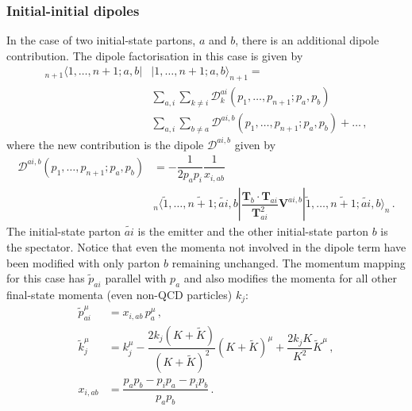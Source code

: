 \documentclass[main.tex]{subfiles}
\begin{document}
        \subsubsection{Initial-initial dipoles}
        In the case of two initial-state partons, $a$ and $b$, there
        is an additional dipole contribution. The dipole factorisation
        in this case is  given by
        \begin{equation}\label{eqn:II_factorisation}
            \begin{split}
                {}_{n+1} \langle 1, \ldots, n+1; a,b|&| 1, \ldots, n+1;a,b \rangle_{n+1} = \\
                &\sum_{a,i}\sum_{k \neq i} \mathcal{D}_{k}^{ai}(p_{1}, \ldots, p_{n+1};p_{a},p_{b}) \\
                &\sum_{a,i}\sum_{b \neq a} \mathcal{D}^{ai,b}(p_{1}, \ldots, p_{n+1};p_{a},p_{b}) + \ldots \, ,
            \end{split}
        \end{equation}
        where the new contribution is the dipole $\mathcal{D}^{ai,b}$ given by
        \begin{equation}\label{eqn:D_aib}
            \begin{split}
                \mathcal{D}^{ai,b}(p_{1},\ldots,p_{n+1};p_{a},p_{b}) &= -\dfrac{1}{2p_{a}p_{i}} \dfrac{1}{x_{i,ab}} \\
                &{}_{n}\langle \tilde{1}, \ldots, \widetilde{n+1}; \widetilde{ai}, b | \dfrac{\boldsymbol{T}_{b}\cdot\boldsymbol{T}_{ai}}{\boldsymbol{T}^{2}_{ai}}\boldsymbol{V}^{ai,b} | \tilde{1}, \ldots, \widetilde{n+1}; \widetilde{ai}, b \rangle_{n} \, .
            \end{split}
        \end{equation}
        The initial-state parton $\widetilde{ai}$ is the emitter and the
        other initial-state parton $b$ is the spectator. Notice that even the
        momenta not involved in the dipole term have been modified with only
        parton $b$ remaining unchanged. The momentum mapping for this case
        has $\tilde{p}_{ai}$ parallel with $p_{a}$ and also
        modifies the momenta for all other final-state momenta (even non-QCD particles) $k_{j}$:
        \begin{align}\label{eqn:II_mapping}
            \tilde{p}_{ai}^{\mu} &= x_{i,ab} \, p_{a}^{\mu} \, , \nonumber \\
            \tilde{k}_{j}^{\mu} &= k_{j}^{\mu} - \dfrac{2k_{j}(K+\widetilde{K})}{(K+\widetilde{K})^{2}}(K+\widetilde{K})^{\mu} + \dfrac{2k_{j}K}{K^{2}}\widetilde{K}^{\mu} \, , \\
            x_{i,ab} &= \dfrac{p_{a}p_{b} - p_{i}p_{a}-p_{i}p_{b}}{p_{a}p_{b}} \, . \nonumber
        \end{align}
\end{document}
